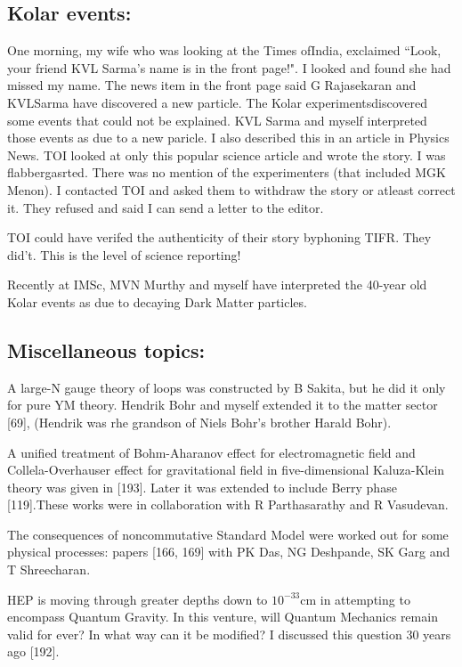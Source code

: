 \subsection*{Kolar events:}

One morning, my wife who was looking at the Times of\break India, exclaimed 
``Look, your friend KVL Sarma's name is in the front page!". I looked and 
found she had missed my name. The news item in the front page said G 
Rajasekaran and KVL\break Sarma have discovered a new particle. The Kolar 
experiments\break discovered some events that could not be explained. KVL 
Sarma and myself interpreted those events as due to a new paricle. I 
also described this in an article in Physics News. TOI looked at only 
this popular science article and wrote the story. I was flabber\-gasrted. 
There was no mention of the experimenters (that included MGK Menon). I 
contacted TOI and asked them to withdra\-w the story or atleast correct 
it. They refused and said I can send a letter to the editor.

TOI could have verifed the authenticity of their story by\break phoning TIFR. 
They did't. This is the level of science repor\-ting!

Recently at IMSc, MVN Murthy and myself have interpreted the 40-year old 
Kolar events as due to decaying Dark Matter parti\-cles.
\newpage

\subsection*{Miscellaneous topics:}

A large-N gauge theory of loops was constructed by B Sakita, but he did 
it only for pure YM theory. Hendrik Bohr and myself extended it to the 
matter sector [69], (Hendrik was rhe grandson of Niels Bohr's brother 
Harald Bohr).


A unified treatment of Bohm-Aharanov effect for electromagne\-tic field 
and Collela-Overhauser effect for gravitational field in 
five-dimensional Kaluza-Klein theory was given in [193]. Later it was 
extended to include Berry phase [119].These works were in collaboration 
with R Parthasarathy and R Vasudevan.


The consequences of noncommutative Standard Model were worked out for 
some physical processes: papers [166, 169] with PK Das, NG Deshpande, SK 
Garg and T Shreecharan.


HEP is moving through greater depths down to $10^{-33}$cm in attempting 
to encompass Quantum Gravity. In this venture, will Quantum Mechanics 
remain valid for ever? In what way can it be modified? I discussed this 
question 30 years ago [192].

